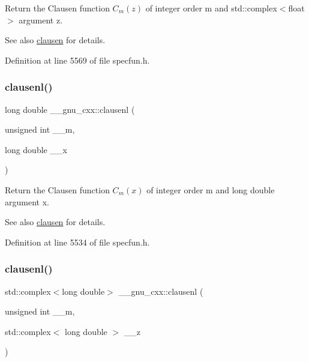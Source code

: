 Return the Clausen function $ C_m(z) $ of integer order {\ttfamily m} and {\ttfamily std\+::complex$<$float$>$} argument {\ttfamily z}.

\begin{DoxySeeAlso}{See also}
\hyperlink{group__mathsf__gnu_ga54e4ba71b1f81718d6998349f91ff88f}{clausen} for details. 
\end{DoxySeeAlso}


Definition at line 5569 of file specfun.\+h.

\mbox{\label{group__mathsf__gnu_ga33132bab39c8d78dde807b45fc06de52}} 
\subsubsection{\texorpdfstring{clausenl()}{clausenl()}\hspace{0.1cm}{\footnotesize\ttfamily [1/2]}}
{\footnotesize\ttfamily long double \+\_\+\+\_\+gnu\+\_\+cxx\+::clausenl (\begin{DoxyParamCaption}\item[{unsigned int}]{\+\_\+\+\_\+m,  }\item[{long double}]{\+\_\+\+\_\+x }\end{DoxyParamCaption})\hspace{0.3cm}{\ttfamily [inline]}}

Return the Clausen function $ C_m(x) $ of integer order {\ttfamily m} and {\ttfamily long double} argument {\ttfamily x}.

\begin{DoxySeeAlso}{See also}
\hyperlink{group__mathsf__gnu_ga54e4ba71b1f81718d6998349f91ff88f}{clausen} for details. 
\end{DoxySeeAlso}


Definition at line 5534 of file specfun.\+h.

\mbox{\label{group__mathsf__gnu_gae39368808280f5c1b80dce7c2f4a67a7}} 
\subsubsection{\texorpdfstring{clausenl()}{clausenl()}\hspace{0.1cm}{\footnotesize\ttfamily [2/2]}}
{\footnotesize\ttfamily std\+::complex$<$long double$>$ \+\_\+\+\_\+gnu\+\_\+cxx\+::clausenl (\begin{DoxyParamCaption}\item[{unsigned int}]{\+\_\+\+\_\+m,  }\item[{std\+::complex$<$ long double $>$}]{\+\_\+\+\_\+z }\end{DoxyParamCaption})\hspace{0.3cm}{\ttfamily [inline]}}

